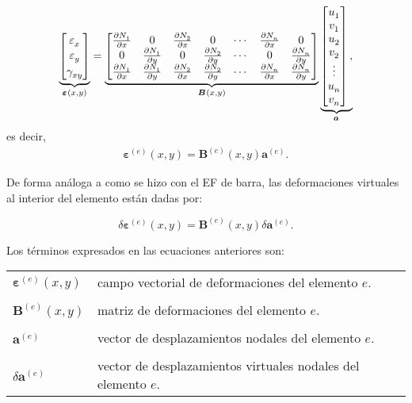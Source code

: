 \documentclass[12pt,letterpaper, landscape]{article}
\newcommand{\e}{{}}
\newcommand{\ve}[1]{{\boldsymbol{#1}}}
\newcommand{\ma}[1]{{\boldsymbol{#1}}}
\begin{document}
\begin{align}
\underbrace{\begin{bmatrix}
  \vphantom{\frac{\partial N_1^\e}{\partial x}} \varepsilon^\e_x \\
  \vphantom{\frac{\partial N_1^\e}{\partial y}} \varepsilon^\e_y \\
  \vphantom{\frac{\partial N_1^\e}{\partial y}} \gamma^\e_{xy}
\end{bmatrix}}_{\ve{\varepsilon}^\e(x,y)}=
\underbrace{\begin{bmatrix}
  \frac{\partial N_1^\e}{\partial x} & 0                                  & \frac{\partial N_2^\e}{\partial x} & 0 & \cdots & \frac{\partial N_n^\e}{\partial x} & 0 \\
   0                                 & \frac{\partial N_1^\e}{\partial y} & 0                                  & \frac{\partial N_2^\e}{\partial y} & \cdots & 0 & \frac{\partial N_n^\e}{\partial y}  \\
  \frac{\partial N_1^\e}{\partial x} & \frac{\partial N_1^\e}{\partial y} & \frac{\partial N_2^\e}{\partial x} & \frac{\partial N_2^\e}{\partial y} & \cdots &
\frac{\partial N_n^\e}{\partial x}   & \frac{\partial N_n^\e}{\partial y}
   \end{bmatrix}}_{\ma{B}^\e(x,y)} 
\underbrace{\begin{bmatrix}
   u_1^\e \\ v_1^\e \\ u_2^\e \\ v_2^\e \\ \vdots \\ u_n^\e \\ v_n^\e 
   \end{bmatrix},}_{\ma{a}^\e}
\end{align}
es decir,
\begin{align}
 \ve{\varepsilon}^{(e)}(x,y) = \ma{B}^{(e)}(x,y)  \ve{a}^{(e)}.
\end{align}

De forma análoga a como se hizo con el EF de barra, las deformaciones virtuales al interior del elemento están dadas por:

\begin{equation}
\delta \ve{\varepsilon}^{(e)}(x,y) = \ma{B}^{(e)}(x,y)  \delta  \ve{a}^{(e)}. \label{eq:delta_varepsilon}
\end{equation}

Los términos expresados en las ecuaciones anteriores son: 

\begin{tabular}{ll}
   $\ve{\varepsilon}^{(e)}(x,y)$     & campo vectorial de deformaciones del elemento $e$.\\
   \\[-1ex]
   $\ma{B}^{(e)}(x,y)$  & {matriz de deformaciones del elemento} $e$.\\
   \\[-1ex]
   $\ve{a}^{(e)}$       & {vector de desplazamientos nodales del elemento} $e$. \\
   \\[-1ex]
   $\delta\ve{a}^{(e)}$ & {vector de desplazamientos virtuales nodales del elemento} $e$.
\end{tabular} 
\end{document}
